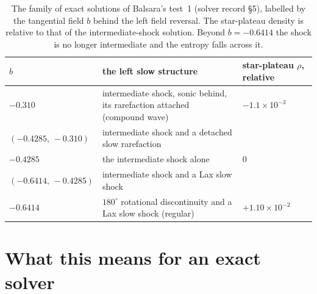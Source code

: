 \documentclass[11pt,a4paper,oneside,openany]{book}
\newcommand{\parencite}{\citep}
\theoremstyle{definition}
\theoremstyle{plain}
\theoremstyle{remark}
\begin{document}
\begin{table}[t]
\centering\small
\begin{tabularx}{\textwidth}{@{}lXl@{}}
\toprule
$b$ & the left slow structure & star-plateau $\rho$, relative\\
\midrule
$-0.310$ & intermediate shock, sonic behind, its rarefaction attached (compound wave) & $-1.1\times10^{-3}$\\
$(-0.4285,\,-0.310)$ & intermediate shock and a detached slow rarefaction & \\
$-0.4285$ & the intermediate shock alone \parencite{GiacomazzoRezzolla2006} & $0$\\
$(-0.6414,\,-0.4285)$ & intermediate shock and a Lax slow shock & \\
$-0.6414$ & $180^\circ$ rotational discontinuity and a Lax slow shock (regular) & $+1.10\times10^{-2}$\\
\bottomrule
\end{tabularx}
\caption{The family of exact solutions of Balsara's test~1 (solver record \S5), labelled by
the tangential field $b$ behind the left field reversal. The star-plateau density is
relative to that of the intermediate-shock solution. Beyond $b=-0.6414$ the shock is no
longer intermediate and the entropy falls across it.}
\label{tab:b1family}
\end{table}

\section{What this means for an exact solver}
\end{document}
